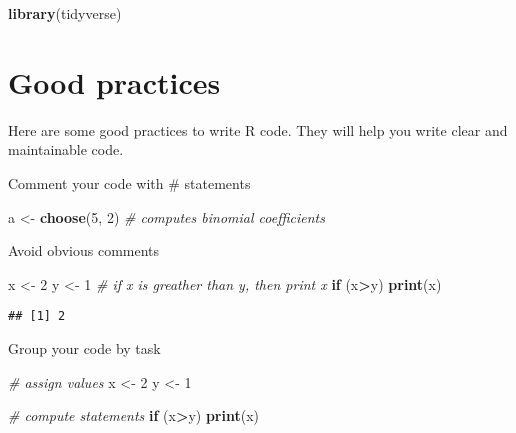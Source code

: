 \documentclass[
]{book}
\newenvironment{Shaded}{\begin{snugshade}}{\end{snugshade}}
\newcommand{\CommentTok}[1]{\textcolor[rgb]{0.56,0.35,0.01}{\textit{#1}}}
\newcommand{\ControlFlowTok}[1]{\textcolor[rgb]{0.13,0.29,0.53}{\textbf{#1}}}
\newcommand{\DecValTok}[1]{\textcolor[rgb]{0.00,0.00,0.81}{#1}}
\newcommand{\FunctionTok}[1]{\textcolor[rgb]{0.13,0.29,0.53}{\textbf{#1}}}
\newcommand{\NormalTok}[1]{#1}
\newcommand{\OtherTok}[1]{\textcolor[rgb]{0.56,0.35,0.01}{#1}}
\newcommand{\SpecialCharTok}[1]{\textcolor[rgb]{0.81,0.36,0.00}{\textbf{#1}}}
\begin{document}
\begin{Shaded}
\begin{Highlighting}[]
\FunctionTok{library}\NormalTok{(tidyverse)}
\end{Highlighting}
\end{Shaded}

\hypertarget{good-practices}{%
\section{Good practices}\label{good-practices}}

Here are some good practices to write R code. They will help you write clear and maintainable code.

Comment your code with \# statements

\begin{Shaded}
\begin{Highlighting}[]
\NormalTok{a }\OtherTok{\textless{}{-}} \FunctionTok{choose}\NormalTok{(}\DecValTok{5}\NormalTok{, }\DecValTok{2}\NormalTok{) }\CommentTok{\# computes binomial coefficients}
\end{Highlighting}
\end{Shaded}

Avoid obvious comments

\begin{Shaded}
\begin{Highlighting}[]
\NormalTok{x }\OtherTok{\textless{}{-}} \DecValTok{2}
\NormalTok{y }\OtherTok{\textless{}{-}} \DecValTok{1}
\CommentTok{\# if x is greather than y, then print x}
\ControlFlowTok{if}\NormalTok{ (x}\SpecialCharTok{\textgreater{}}\NormalTok{y) }\FunctionTok{print}\NormalTok{(x)}
\end{Highlighting}
\end{Shaded}

\begin{verbatim}
## [1] 2
\end{verbatim}

Group your code by task

\begin{Shaded}
\begin{Highlighting}[]
\CommentTok{\# assign values}
\NormalTok{x }\OtherTok{\textless{}{-}} \DecValTok{2}
\NormalTok{y }\OtherTok{\textless{}{-}} \DecValTok{1}

\CommentTok{\# compute statements}
\ControlFlowTok{if}\NormalTok{ (x}\SpecialCharTok{\textgreater{}}\NormalTok{y) }\FunctionTok{print}\NormalTok{(x)}
\end{Highlighting}
\end{Shaded}
\end{document}
